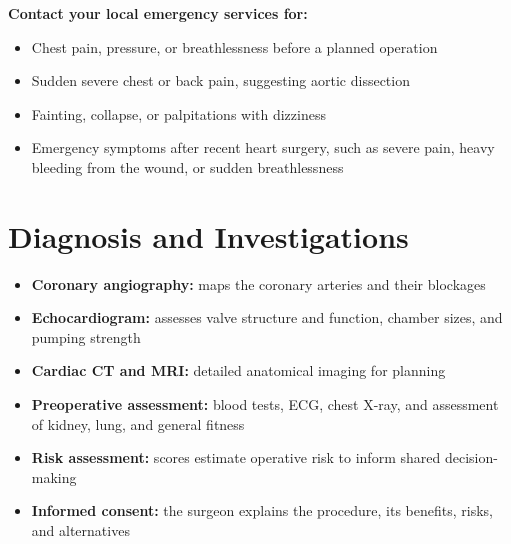 \textbf{Contact your local emergency services for:}
\begin{itemize}
    \item Chest pain, pressure, or breathlessness before a planned operation
    \item Sudden severe chest or back pain, suggesting aortic dissection
    \item Fainting, collapse, or palpitations with dizziness
    \item Emergency symptoms after recent heart surgery, such as severe pain, heavy bleeding from the wound, or sudden breathlessness
\end{itemize}

\section*{Diagnosis and Investigations}
\begin{itemize}
    \item \textbf{Coronary angiography:} maps the coronary arteries and their blockages
    \item \textbf{Echocardiogram:} assesses valve structure and function, chamber sizes, and pumping strength
    \item \textbf{Cardiac CT and MRI:} detailed anatomical imaging for planning
    \item \textbf{Preoperative assessment:} blood tests, ECG, chest X-ray, and assessment of kidney, lung, and general fitness
    \item \textbf{Risk assessment:} scores estimate operative risk to inform shared decision-making
    \item \textbf{Informed consent:} the surgeon explains the procedure, its benefits, risks, and alternatives
\end{itemize}

